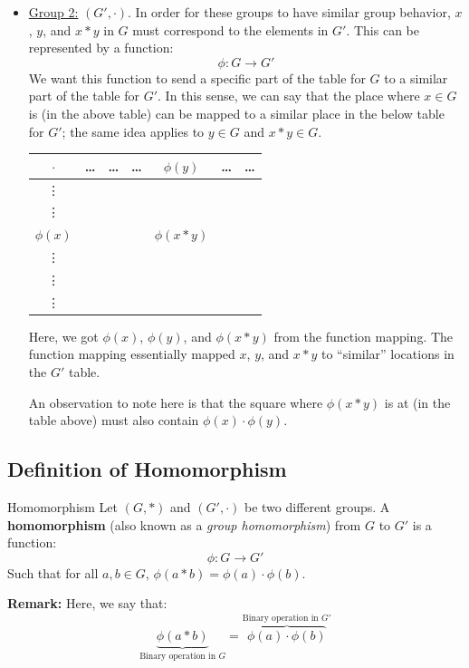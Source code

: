 \documentclass[letterpaper]{article}
\begin{document}
\begin{itemize}
    \item \underline{Group 2:} $(G', \cdot)$. In order for these groups to have similar group behavior, $x$, $y$, and $x * y$ in $G$ must correspond to the elements in $G'$. This can be represented by a function: 
    \[\phi: G \to G'\]
    We want this function to send a specific part of the table for $G$ to a similar part of the table for $G'$. In this sense, we can say that the place where $x \in G$ is (in the above table) can be mapped to a similar place in the below table for $G'$; the same idea applies to $y \in G$ and $x * y \in G$.  
    \begin{center}
        \begin{tabular}{|c|c c c|c|c c|}
            \hline 
            $\cdot$   & \dots & \dots & \dots & $\phi(y)$      & \dots & \dots \\ 
            \hline 
            \vdots    &       &       &       &                &       &        \\ 
            \vdots    &       &       &       &                &       &        \\ 
            \hline 
            $\phi(x)$ &       &       &       & $\phi(x * y)$  &       &        \\ 
            \hline 
            \vdots    &       &       &       &                &       &        \\ 
            \vdots    &       &       &       &                &       &        \\ 
            \vdots    &       &       &       &                &       &        \\ 
            \hline 
        \end{tabular}
    \end{center}
    Here, we got $\phi(x)$, $\phi(y)$, and $\phi(x * y)$ from the function mapping. The function mapping essentially mapped $x$, $y$, and $x * y$ to ``similar'' locations in the $G'$ table. 

    \bigskip 

    An observation to note here is that the square where $\phi(x * y)$ is at (in the table above) must also contain $\phi(x) \cdot \phi(y)$. 
\end{itemize}




\subsection{Definition of Homomorphism}
\begin{definition}{Homomorphism}{}
    Let $(G, *)$ and $(G', \cdot)$ be two different groups. A \textbf{homomorphism} (also known as a \emph{group homomorphism}) from $G$ to $G'$ is a function: 
    \[\phi: G \to G'\]
    Such that for all $a, b \in G$, $\phi(a * b) = \phi(a) \cdot \phi(b)$. 
\end{definition}
\textbf{Remark:} Here, we say that: 
\[\underbrace{\phi(a * b)}_{\text{Binary operation in } G} = \overbrace{\phi(a) \cdot \phi(b)}^{\text{Binary operation in } G'}\]
\end{document}
